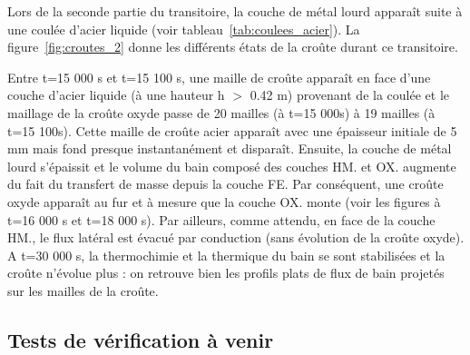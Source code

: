 Lors de la seconde partie du transitoire, la couche de métal lourd apparaît suite à une coulée d'acier liquide (voir tableau~\ref{tab:coulees_acier}). La figure~\ref{fig:croutes_2} donne les différents états de la croûte durant ce transitoire.

Entre t=15 000 s et t=15 100 s, une maille de croûte apparaît en face d'une couche d'acier liquide (à une hauteur h $>$ 0.42 m) provenant de la coulée et le maillage de la croûte oxyde passe de 20 mailles (à t=15 000s) à 19 mailles (à t=15 100s). Cette maille de croûte acier apparaît avec une épaisseur initiale de 5 mm mais fond presque instantanément et disparaît. Ensuite, la couche de métal lourd s'épaissit et le volume du bain composé des couches HM. et OX. augmente du fait du transfert de masse depuis la couche FE. Par conséquent, une croûte oxyde apparaît au fur et à mesure que la couche OX. monte (voir les figures à t=16 000 s et t=18 000 s). Par ailleurs, comme attendu, en face de la couche HM., le flux latéral est évacué par conduction (sans évolution de la croûte oxyde). A t=30 000 s, la thermochimie et la thermique du bain se sont stabilisées et la croûte n'évolue plus : on retrouve bien les profils plats de flux de bain projetés sur les mailles de la croûte.
\fi

\subsection{Tests de vérification à venir}

